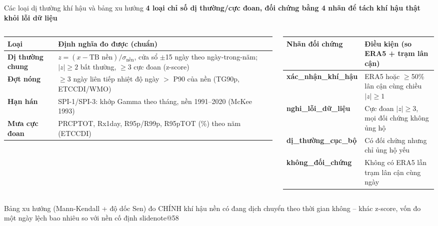 \documentclass[t,aspectratio=169,12pt]{beamer}
\makeatletter
\newcommand{\slidenote}[1]{\ifcsname slidenote@#1\endcsname\note{\csname slidenote@#1\endcsname}\fi}
\newcommand{\ketluan}[1]{\vskip2mm{\color{hustred}#1}}
\newcommand{\ychinh}[1]{\vskip1mm{\bfseries #1}\par\vskip1mm}
\makeatother
\begin{document}
\begin{frame}{Các loại dị thường khí hậu và bảng xu hướng}
  \ychinh{\small 4 loại chỉ số dị thường/cực đoan, đối chứng bằng 4 nhãn để tách khí hậu thật khỏi lỗi dữ liệu}
  \begin{columns}[T]
    \begin{column}{0.56\textwidth}
      \tiny
      \renewcommand{\arraystretch}{0.88}
      \begin{tabular}{@{}>{\bfseries}p{1.6cm}p{6.1cm}@{}}
        \toprule
        Loại & Định nghĩa đo được (chuẩn) \\
        \midrule
        Dị thường chung & $z=(x-\text{TB nền})/\sigma_{\text{nền}}$, cửa sổ $\pm$15 ngày theo ngày-trong-năm;
          $|z|\geq2$ bất thường, $\geq3$ cực đoan (z-score) \\
        Đợt nóng & $\geq$3 ngày liên tiếp nhiệt độ ngày $>$ P90 của nền (TG90p, ETCCDI/WMO) \\
        Hạn hán & SPI-1/SPI-3: khớp Gamma theo tháng, nền 1991--2020 (McKee 1993) \\
        Mưa cực đoan & PRCPTOT, Rx1day, R95p/R99p, R95pTOT (\%) theo năm (ETCCDI) \\
        \bottomrule
      \end{tabular}
    \end{column}
    \begin{column}{0.46\textwidth}
      \tiny
      \renewcommand{\arraystretch}{0.88}
      \begin{tabular}{@{}>{\bfseries}p{1.8cm}p{4.4cm}@{}}
        \toprule
        Nhãn đối chứng & Điều kiện (so ERA5 + trạm lân cận) \\
        \midrule
        xác\_nhận\_khí\_hậu & ERA5 hoặc $\geq$50\% lân cận cùng chiều $|z|\geq1$ \\
        nghi\_lỗi\_dữ\_liệu & Cực đoan $|z|\geq3$, mọi đối chứng không ủng hộ \\
        dị\_thường\_cục\_bộ & Có đối chứng nhưng chỉ ủng hộ yếu \\
        không\_đối\_chứng & Không có ERA5 lẫn trạm lân cận cùng ngày \\
        \bottomrule
      \end{tabular}
    \end{column}
  \end{columns}
  \ketluan{\scriptsize Bảng xu hướng (Mann-Kendall + độ dốc Sen) đo CHÍNH khí hậu nền có đang dịch chuyển theo
    thời gian không -- khác z-score, vốn đo một ngày lệch bao nhiêu so với nền cố định}
  \slidenote{58}
\end{frame}
\end{document}
